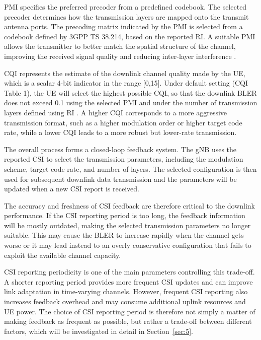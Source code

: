 \documentclass[a4paper,12pt,onecolumn]{article}
\begin{document}
		PMI specifies the preferred precoder from a predefined codebook. The selected precoder determines how the transmission layers are mapped onto the transmit antenna ports. The precoding matrix indicated by the PMI is selected from a codebook defined by 3GPP TS 38.214, based on the reported RI. A suitable PMI allows the transmitter to better match the spatial structure of the channel, improving the received signal quality and reducing inter-layer interference \cite{3GPP2026a}.
	
		CQI represents the estimate of the downlink channel quality made by the UE, which is a scalar 4-bit indicator in the range [0,15]. Under default setting (CQI Table 1), the UE will select the highest possible CQI, so that the downlink BLER does not exceed 0.1 using the selected PMI and under the number of transmission layers defined using RI \cite{MathWorks_CSI}. A higher CQI corresponds to a more aggressive transmission format, such as a higher modulation order or higher target code rate, while a lower CQI leads to a more robust but lower-rate transmission.
	
		The overall process forms a closed-loop feedback system. The gNB uses the reported CSI to select the transmission parameters, including the modulation scheme, target code rate, and number of layers. The selected configuration is then used for subsequent downlink data transmission and the parameters will be updated when a new CSI report is received. 
	
		The accuracy and freshness of CSI feedback are therefore critical to the downlink performance. If the CSI reporting period is too long, the feedback information will be mostly outdated, making the selected transmission parameters no longer suitable. This may cause the BLER to increase rapidly when the channel gets worse or it may lead instead to an overly conservative configuration that fails to exploit the available channel capacity.
		
		CSI reporting periodicity is one of the main parameters controlling this trade-off. A shorter reporting period provides more frequent CSI updates and can improve link adaptation in time-varying channels. However, frequent CSI reporting also increases feedback overhead and may consume additional uplink resources and UE power. The choice of CSI reporting period is therefore not simply a matter of making feedback as frequent as possible, but rather a trade-off between different factors, which will be investigated in detail in Section~\ref{sec:5}.
\end{document}
